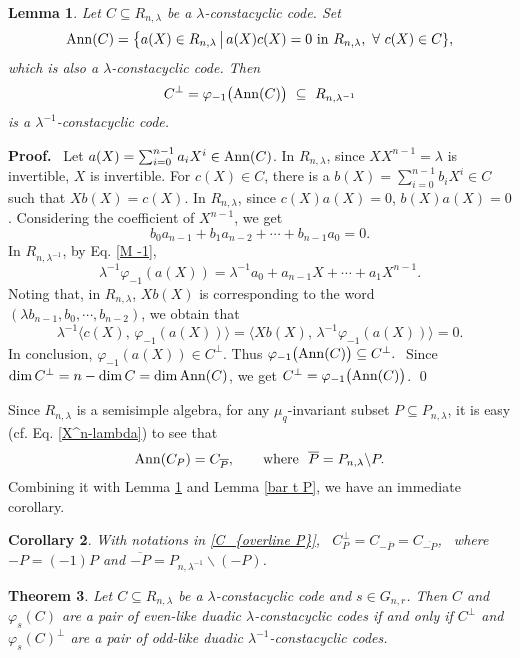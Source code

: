 \documentclass{article}
\newtheorem{Theorem}{Theorem}[section]
\newtheorem{Lemma}[Theorem]{Lemma}
\newtheorem{Corollary}[Theorem]{Corollary}
\numberwithin{equation}{section}
\numberwithin{table}{section}
\def\pf{\par{\bf Proof.}~ }
\def\M{{\varphi}} \def\N{{\psi}} \def\m{{\mu}}
\begin{document}
\begin{Lemma}\label{dual code}
Let $C\subseteq R_{n,\lambda}$ be a $\lambda$-constacyclic code. Set
$$
 {\rm Ann}(C)=\big\{a(X)\in R_{n,\lambda}\,\big|\,
   a(X)c(X)=0~{\rm in}~R_{n,\lambda},~\forall~c(X)\in C\},
$$
which is also a $\lambda$-constacyclic code.
Then
$$C^{\bot}=\M _{-1}\big({\rm Ann}(C)\big)~\subseteq~ R_{n,\lambda^{-1}}$$
is a $\lambda^{-1}$-constacyclic code.
\end{Lemma}

\pf
Let $a(X)=\sum_{i=0}^{n-1}a_iX^i\in {\rm Ann}(C)$. In $R_{n,\lambda}$,
since $XX^{n-1}=\lambda$ is invertible, $X$ is invertible.
For $c(X)\in C$,
there is a $b(X)=\sum_{i=0}^{n-1}b_iX^i\in C$ such that $Xb(X)=c(X)$.
In $R_{n,\lambda}$, since $c(X) a(X)=0$, $b(X) a(X)=0$.
Considering the coefficient of $X^{n-1}$, we get
$$ b_0a_{n-1}+b_1a_{n-2}+\cdots+b_{n-1}a_0=0.$$
In $R_{n,\lambda^{-1}}$, by Eq. \eqref{M -1}, 
$$\lambda^{-1}\M_{-1}(a(X))=\lambda^{-1}a_0+ a_{n-1}X+\cdots+a_1X^{n-1}.$$
Noting that, in $R_{n,\lambda}$, $Xb(X)$ is corresponding to the word
$(\lambda b_{n-1},b_0,\cdots,b_{n-2})$, we obtain that
$$\lambda^{-1}\big\langle c(X),\, \M_{-1}(a(X))\big\rangle
 =\big\langle Xb(X), \,\lambda^{-1}\M_{-1}(a(X))\big\rangle=0.
$$
In conclusion, $\M_{-1}(a(X))\in C^\bot$. Thus
$
\M _{-1}\big({\rm Ann}(C)\big)\subseteq C^{\bot}.~
$
Since $\dim C^\bot=n-\dim C=\dim{\rm Ann}(C)$,
we get $C^{\bot}=\M _{-1}\big({\rm Ann}(C)\big)$.
\qed

Since $R_{n,\lambda}$ is a semisimple algebra,
for any $\mu_q$-invariant subset $P\subseteq P_{n,\lambda}$,
it is easy (cf. Eq. \eqref{X^n-lambda}) to see that
\begin{equation}\label{C_{overline P}}
 {\rm Ann}(C_P)=C_{\overline P}, \qquad
 \mbox{where}~~\overline P =P_{n,\lambda}\backslash P.
\end{equation}
Combining it with Lemma \ref{dual code} and Lemma \ref{bar t P},
we have an immediate corollary.

\begin{Corollary}\label{dual code'} With notations in \eqref{C_{overline P}},~
$C_P^\bot =C_{-\overline P}=C_{\overline{-P}}$,~ where
$-P=(-1)P$ and $\overline{-P}=P_{n,\lambda^{-1}}\backslash(-P)$.
\end{Corollary}

\begin{Theorem}\label{even odd}
Let $C\subseteq R_{n,\lambda}$ be a 
$\lambda$-constacyclic code and $s\in G_{n,r}$. 
Then $C$ and $\M_s(C)$ are a pair of even-like duadic 
$\lambda$-constacyclic codes if and only if 
$C^\bot$ and $\M_s(C)^\bot$ are a pair of odd-like duadic
$\lambda^{-1}$-constacyclic codes.
\end{Theorem}
\end{document}
